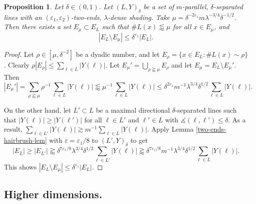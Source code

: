 \documentclass{amsart}
\numberwithin{equation}{section}
\newtheorem{proposition}[theorem]{Proposition}
\newcommand{\de}{\delta}
\newcommand{\e}{\varepsilon}
\newcommand{\la}{\lambda}
\newcommand{\ang}{\measuredangle}
\begin{document}
\begin{proposition}
\label{kakeya-prop}
Let $\de\in(0,1)$.
Let $(L,Y)_\de$ be a set of $m$-parallel, $\de$-separated lines with an $(\e_1, \e_2)$-two-ends, $\la$-dense shading. Take $\mu=\de^{-2\e_1}m\la^{-3/4}\de^{-1/2}$. Then there exists a set $E_\mu\subset E_L$ such that $\# L(x)\lessapprox \mu$ for all $x\in E_\mu$, and
\begin{equation}
    |E_L\setminus E_\mu|\leq \de^{\e_1}|E_L|.
\end{equation}
\end{proposition}
\begin{proof}
Let $\rho\in[\mu,\de^{-2}]$ be a dyadic number, and let $E_\rho=\{x\in E_L:\# L(x)\sim\rho\}$. 
Clearly $\rho|E_\rho|\leq\sum_{\ell\in L} |Y(\ell)|$. 
Let $E_\mu'=\bigcup_{\rho\gtrapprox\mu}E_\rho$ and let $E_\mu=E_L\setminus E_\mu'$. Then
\begin{equation}
    |E_\mu'|=\sum_{\rho\gtrapprox\mu}\rho^{-1} \sum_{\ell\in L} |Y(\ell)|\lessapprox\mu^{-1} \sum_{\ell\in L} |Y(\ell)|\leq \de^{2\e_1}m^{-1}\la^{3/4}\de^{1/2} \sum_{\ell\in L} |Y(\ell)|. 
\end{equation}

On the other hand, let $L'\subset L$ be a maximal directional $\de$-separated lines such that $|Y(\ell)|\geq |Y(\ell')|$ for all $\ell\in L'$ and $\ell'\in L$ with $\ang(\ell, \ell')\leq\de$. 
As a result, $\sum_{\ell\in L'}|Y(\ell)|\gtrsim m^{-1}\sum_{\ell\in L}|Y(\ell)|$. 
Apply Lemma \ref{two-ends-hairbrush-lem} with $\e=\e_1/8$ to $(L',Y)_\de$ to get
\begin{equation}
    |E_L|\geq |E_{L'}|\gtrapprox \de^{7\e_1/8}\la^{3/4}\de^{1/2} \sum_{\ell\in L'} |Y(\ell)|\gtrapprox\de^{7\e_1/8}m^{-1}\la^{3/4}\de^{1/2} \sum_{\ell\in L} |Y(\ell)|.
\end{equation}
This shows $|E_L\setminus E_\mu|\leq \de^{\e_1}|E_L|$. 
\end{proof}


\medskip

\subsection{Higher dimensions.}
\end{document}
